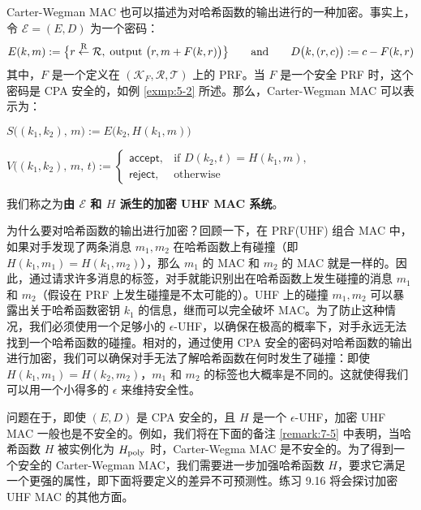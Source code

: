 \begin{snote}
Carter-Wegman MAC 也可以描述为对哈希函数的输出进行的一种加密。事实上，令 $\mathcal{E}=(E,D)$ 为一个密码：
\[
E(k,m):=\big\{r\overset{\rm R}\leftarrow\mathcal{R},\;\text{output }\big(r,m+F(k,r)\big)\big\}
\quad\quad\text{and}\quad\quad
D\big(k,(r,c)\big):=c-F(k,r)
\]
其中，$F$ 是一个定义在 $(\mathcal{K}_F,\mathcal{R},\mathcal{T})$ 上的 PRF。当 $F$ 是一个安全 PRF 时，这个密码是 CPA 安全的，如例 \ref{exmp:5-2} 所述。那么，Carter-Wegman MAC 可以表示为：

\vspace{5pt}

\hspace*{5pt} $S\big((k_1,k_2),\,m\big):=E\big(k_2,H(k_1,m)\big)$

\vspace{5pt}

\hspace*{5pt} $
V\big((k_1,k_2),\,m,\,t\big):=\left\{
\begin{array}{ll}
\mathsf{accept}, & \text{if }D(k_2,t)=H(k_1,m),\\
\mathsf{reject}, & \text{otherwise}
\end{array}
\right.
$

\vspace{8pt}

\noindent
我们称之为\textbf{由 $\mathcal{E}$ 和 $H$ 派生的加密 UHF MAC 系统}。

为什么要对哈希函数的输出进行加密？回顾一下，在 PRF(UHF) 组合 MAC 中，如果对手发现了两条消息 $m_1,m_2$ 在哈希函数上有碰撞（即 $H(k_1,m_1)=H(k_1,m_2)$），那么 $m_1$ 的 MAC 和 $m_2$ 的 MAC 就是一样的。因此，通过请求许多消息的标签，对手就能识别出在哈希函数上发生碰撞的消息 $m_1$ 和 $m_2$（假设在 PRF 上发生碰撞是不太可能的）。UHF 上的碰撞 $m_1,m_2$ 可以暴露出关于哈希函数密钥 $k_1$ 的信息，继而可以完全破坏 MAC。为了防止这种情况，我们必须使用一个足够小的 $\epsilon$-UHF，以确保在极高的概率下，对手永远无法找到一个哈希函数的碰撞。相对的，通过使用 CPA 安全的密码对哈希函数的输出进行加密，我们可以确保对手无法了解哈希函数在何时发生了碰撞：即使 $H(k_1,m_1)=H(k_2,m_2)$，$m_1$ 和 $m_2$ 的标签也大概率是不同的。这就使得我们可以用一个小得多的 $\epsilon$ 来维持安全性。

问题在于，即使 $(E,D)$ 是 CPA 安全的，且 $H$ 是一个 $\epsilon$-UHF，加密 UHF MAC 一般也是不安全的。例如，我们将在下面的备注 \ref{remark:7-5} 中表明，当哈希函数 $H$ 被实例化为 $H_{\rm poly}$ 时，Carter-Wegma MAC 是不安全的。为了得到一个安全的 Carter-Wegman MAC，我们需要进一步加强哈希函数 $H$，要求它满足一个更强的属性，即下面将要定义的差异不可预测性。练习 9.16 将会探讨加密 UHF MAC 的其他方面。
\end{snote}

